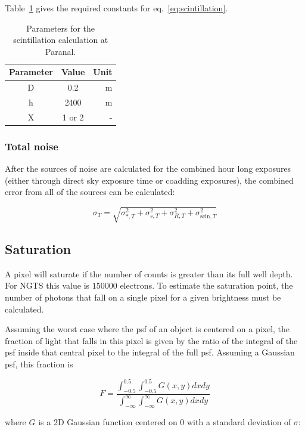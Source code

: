 \documentclass[11pt,a4paper]{report}
\begin{document}
Table~\ref{tab:scintillationparams} gives the required constants for
eq.~\ref{eq:scintillation}.


\begin{table}
    \centering
    \begin{tabular}{ccr}
        \toprule
        Parameter & Value & Unit \\
        \midrule
        D & 0.2 & m \\
        h & 2400 & m \\
        X & 1 or 2 & - \\
        \bottomrule
    \end{tabular}
    \caption{Parameters for the scintillation calculation at Paranal.}
    \label{tab:scintillationparams}
\end{table}


\subsubsection{Total noise}

After the sources of noise are calculated for the combined hour long 
exposures (either through direct sky exposure time or coadding 
exposures), the combined error from all of the sources can be
calculated:

\[
    \sigma_T = \sqrt{\sigma_{\ast,T}^2 + \sigma_{s,T}^2 + \sigma_{R,T}^2 +
    \sigma_{\mathrm{scin},T}^2}
    \]





\subsection{Saturation}

A pixel will saturate if the number of counts is greater than its 
full well depth. For NGTS this value is $150000$ electrons. To 
estimate the saturation point, the number of photons that fall on 
a single pixel for a given brightness must be calculated. 

Assuming the worst case where the psf of an object is centered on 
a pixel, the fraction of light that falls in this pixel is given 
by the ratio of the integral of the psf inside that central pixel to
the integral of the full psf. Assuming a Gaussian psf, this fraction is

\[
    F = \frac{\int_{-0.5}^{0.5}\int_{-0.5}^{0.5} G(x,y) dx dy}
    {\int_{-\infty}^{\infty}\int_{-\infty}^{\infty} G(x,y) dx dy}
    \]

where $G$ is a 2D Gaussian function centered on $0$ with a standard
deviation of $\sigma$:  
\end{document}
